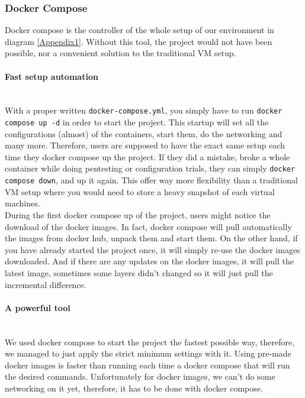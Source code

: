 \documentclass[a4paper,11pt,singlespacing]{article}
\begin{document}
\subsubsection{Docker Compose}
Docker compose is the controller of the whole setup of our environment in diagram \ref{Appendix1}. Without this tool, the project would not have been possible, nor a convenient solution to the traditional VM setup.

\paragraph{Fast setup automation}
\leavevmode\\
With a proper written \texttt{docker-compose.yml}, you simply have to run \texttt{docker compose up -d} in order to start the project. This startup will set all the configurations (almost) of the containers, start them, do the networking and many more. Therefore, users are supposed to have the exact same setup each time they docker compose up the project. If they did a mistake, broke a whole container while doing pentesting or configuration trials, they can simply \texttt{docker compose down}, and up it again. This offer way more flexibility than a traditional VM setup where you would need to store a heavy snapshot of each virtual machines.\\

During the first docker compose up of the project, users might notice the download of the docker images. In fact, docker compose will pull automatically the images from docker hub, unpack them and start them. On the other hand, if you have already started the project once, it will simply re-use the docker images downloaded. And if there are any updates on the docker images, it will pull the latest image, sometimes some layers didn't changed so it will just pull the incremental difference.

\paragraph{A powerful tool}
\leavevmode\\
We used docker compose to start the project the fastest possible way, therefore, we managed to just apply the strict minimum settings with it. Using pre-made docker images is faster than running each time a docker compose that will run the desired commands. Unfortunately for docker images, we can't do some networking on it yet, therefore, it has to be done with docker compose.\\
\end{document}

